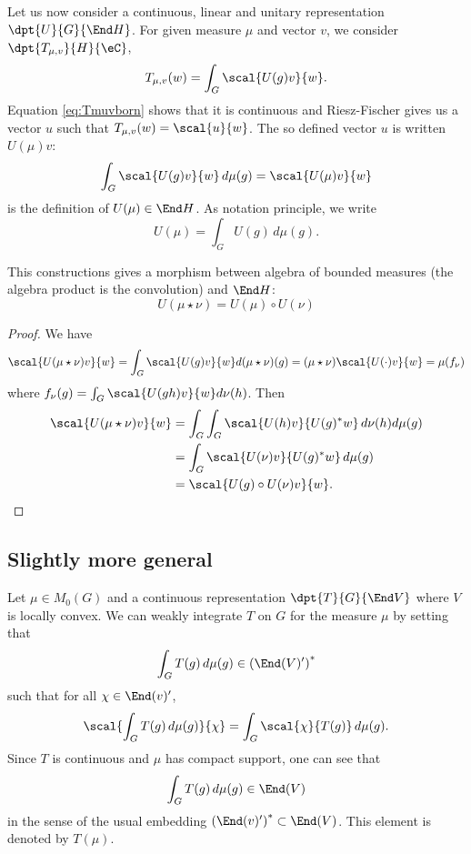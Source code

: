 Let us now consider a continuous, linear and unitary representation $\dpt{U}{G}{\End H}$. For given measure $\mu$ and vector $v$, we consider $\dpt{T_{\mu,v}}{H}{\eC}$,
\[
  T_{\mu,v}(w)=\int_G\scal{U(g)v}{w}.
\]
Equation \eqref{eq:Tmuvborn} shows that it is continuous and Riesz-Fischer gives us a vector $u$ such that $T_{\mu,v}(w)=\scal{u}{w}$. The so defined vector $u$ is written $U(\mu)v$:
\begin{equation}
   \int_G \scal{U(g)v}{w}\,d\mu(g)=\scal{U(\mu)v}{w}
\end{equation}
is the definition of $U(\mu)\in\End H$. As notation principle, we write
\[
  U(\mu)=\int_GU(g)\,d\mu(g).
\]

\begin{proposition}

This constructions gives a morphism between algebra of bounded measures (the algebra product is the convolution) and $\End H$:
\begin{equation}
  U( \mu\star\nu)=U(\mu)\circ U(\nu)
\end{equation}

\end{proposition}


\begin{proof}
We have
\begin{equation}
\scal{U(\mu\star\nu)v}{w}=\int_G \scal{U(g)v}{w}d(\mu\star\nu)(g)
		=(\mu\star\nu)\scal{U(\cdot)v}{w}
		=\mu(f_{\nu})
\end{equation}
where $f_{\nu}(g)=\int_G\scal{U(gh)v}{w}d\nu(h)$. Then
\begin{equation}
\begin{split}
\scal{U(\mu\star\nu)v}{w}&=\int_G\int_G \scal{U(h)v}{U(g)^*w}\,d\nu(h)d\mu(g)\\
		&=\int_G\scal{U(\nu)v}{U(g)^*w}\,d\mu(g)\\
		&=\scal{U(g)\circ U(\nu)v}{w}.
\end{split}
\end{equation}
\end{proof}

\subsection{Slightly more general}

Let $\mu\in M_0(G)$ and a continuous representation $\dpt{T}{G}{\End V}$ where $V$ is locally convex. We can weakly integrate $T$ on $G$ for the measure $\mu$ by setting that
\[
  \int_G T(g)\,d\mu(g)\in\left( \End(V)' \right)^*
\]
such that for all $\chi\in\End(v)'$,
\begin{equation}
\scal{\int_G T(g)\,d\mu(g)}{\chi}=\int_G\scal{\chi}{T(g)}\,d\mu(g).
\end{equation}
Since $T$ is continuous and $\mu$ has compact support, one can see that
\[
  \int_GT(g)\,d\mu(g)\in\End(V)
\]
in the sense of the usual embedding $\left( \End(v)' \right)^*\subset\End(V)$. This element is denoted by $T(\mu)$.

